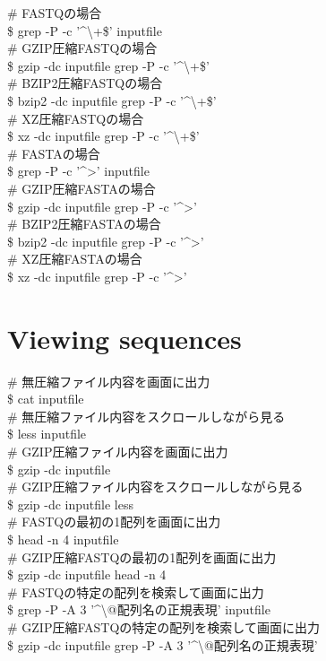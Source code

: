 \documentclass[titlepage,10pt,a4paper,english]{jsbook}
\newenvironment{cmd}{\begin{oframed}\raggedright\ttfamily\footnotesize\setlength{\baselineskip}{1.4em}}{\end{oframed}\vspace{-1em}}
\begin{document}
\begin{cmd}
\# FASTQの場合\\
\$ grep -P -c '{\textasciicircum}{\textbackslash}+\$' inputfile\\
\# GZIP圧縮FASTQの場合\\
\$ gzip -dc inputfile {\textbar} grep -P -c '{\textasciicircum}{\textbackslash}+\$'\\
\# BZIP2圧縮FASTQの場合\\
\$ bzip2 -dc inputfile {\textbar} grep -P -c '{\textasciicircum}{\textbackslash}+\$'\\
\# XZ圧縮FASTQの場合\\
\$ xz -dc inputfile {\textbar} grep -P -c '{\textasciicircum}{\textbackslash}+\$'\\
\# FASTAの場合\\
\$ grep -P -c '{\textasciicircum}{\textgreater}' inputfile\\
\# GZIP圧縮FASTAの場合\\
\$ gzip -dc inputfile {\textbar} grep -P -c '{\textasciicircum}{\textgreater}'\\
\# BZIP2圧縮FASTAの場合\\
\$ bzip2 -dc inputfile {\textbar} grep -P -c '{\textasciicircum}{\textgreater}'\\
\# XZ圧縮FASTAの場合\\
\$ xz -dc inputfile {\textbar} grep -P -c '{\textasciicircum}{\textgreater}'
\end{cmd}

\section{Viewing sequences}

\begin{cmd}
\# 無圧縮ファイル内容を画面に出力\\
\$ cat inputfile\\
\# 無圧縮ファイル内容をスクロールしながら見る\\
\$ less inputfile\\
\# GZIP圧縮ファイル内容を画面に出力\\
\$ gzip -dc inputfile\\
\# GZIP圧縮ファイル内容をスクロールしながら見る\\
\$ gzip -dc inputfile {\textbar} less\\
\# FASTQの最初の1配列を画面に出力\\
\$ head -n 4 inputfile\\
\# GZIP圧縮FASTQの最初の1配列を画面に出力\\
\$ gzip -dc inputfile {\textbar} head -n 4\\
\# FASTQの特定の配列を検索して画面に出力\\
\$ grep -P -A 3 '{\textasciicircum}{\textbackslash}@配列名の正規表現' inputfile\\
\# GZIP圧縮FASTQの特定の配列を検索して画面に出力\\
\$ gzip -dc inputfile {\textbar} grep -P -A 3 '{\textasciicircum}{\textbackslash}@配列名の正規表現'
\end{cmd}
\end{document}
